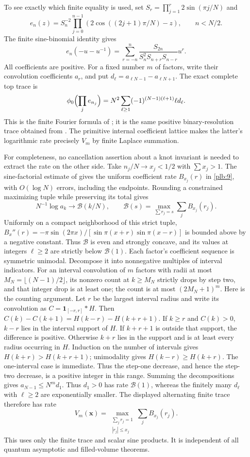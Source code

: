 To see exactly which finite equality is used, set
$S_r=\prod_{j=1}^r2\sin(\pi j/N)$ and
\[
 e_n(z)=S_n^{-2}\prod_{j=0}^{n-1}
       (2\cos((2j+1)\pi/N)-z),\qquad n<N/2.
\]
The finite sine-binomial identity gives
\[
 e_n(-u-u^{-1})=\sum_{r=-n}^n
 \frac{S_{2n}}{S_n^2S_{n+r}S_{n-r}}u^r.
\]
All coefficients are positive. For a fixed number $m$ of factors,
write their convolution coefficients $a_r$, and put
$d_\ell=a_{\ell N-1}-a_{\ell N+1}$. The exact complete top trace is
\[
 \phi_0\Bigl(\prod_j e_{n_j}\Bigr)
 =N^2\sum_{\ell\ge1}(-1)^{(N-1)(\ell+1)}\ell d_\ell.
\]
This is the finite Fourier formula of \cite[Lemma 6.1]{SourceBounds};
it is the same positive binary-resolution trace obtained from
\cite[Proposition 3.2 and Theorem 3.3]{Newton}.
The primitive internal coefficient lattice makes the latter's logarithmic
rate precisely $V_m$ by finite Laplace summation.

For completeness, no cancellation assertion about a knot invariant is
needed to extract the rate on the other side. Take $n_j/N\to x_j<1/2$
with $\sum x_j>1$. The sine-factorial estimate
of \cite[Lemma 6.2]{Newton} gives the uniform coefficient
rate $B_{x_j}(r)$ in \eqref{plb:9}, with $O(\log N)$ errors, including
the endpoints. Rounding a constrained maximizing tuple while preserving
its total gives
\[
 N^{-1}\log a_{k}\longrightarrow
 \mathcal B(k/N),\qquad
 \mathcal B(s)=\max_{\sum r_j=s}\sum_jB_{x_j}(r_j).
\]
Uniformly on a compact neighborhood of this strict tuple,
$B_x''(r)=-\pi\sin(2\pi x)/[\sin\pi(x+r)\sin\pi(x-r)]$
is bounded above by a negative constant. Thus $\mathcal B$ is even
and strongly concave, and its values at integers $\ell\ge2$ are
strictly below $\mathcal B(1)$.
Each factor's coefficient sequence is symmetric unimodal. Decompose it
into nonnegative multiples of interval indicators. For an interval
convolution of $m$ factors with radii at most $M_N=\lfloor(N-1)/2\rfloor$,
its nonzero count at $k\ge M_N$ strictly drops by step two, and that
integer drop is at least one; the count is at most $(2M_N+1)^m$.
Here is the counting argument. Let $r$ be the largest interval radius
and write its convolution as $C=\mathbf1_{[-r,r]}*H$. Then
$C(k)-C(k+1)=H(k-r)-H(k+r+1)$. If $k\ge r$ and $C(k)>0$,
$k-r$ lies in the interval support of $H$. If $k+r+1$ is outside
that support, the difference is positive. Otherwise $k+r$ lies
in the support and is at least every radius occurring in $H$.
Induction on the number of intervals gives
$H(k+r)>H(k+r+1)$; unimodality gives $H(k-r)\ge H(k+r)$.
The one-interval case is immediate. Thus the step-one decrease,
and hence the step-two decrease, is a positive integer in this range.
Summing the decompositions gives
$a_{N-1}\le N^m d_1$. Thus $d_1>0$ has rate $\mathcal B(1)$,
whereas the finitely many $d_\ell$ with $\ell\ge2$ are exponentially
smaller. The displayed alternating finite trace therefore has rate
\begin{equation}\label{plb:10}
 V_m(\mathbf x)=\max_{\substack{\sum_jr_j=1\\ |r_j|\le x_j}}
                              \sum_jB_{x_j}(r_j).
\end{equation}
This uses only the finite trace and scalar sine products. It is
independent of all quantum asymptotic and filled-volume theorems.

